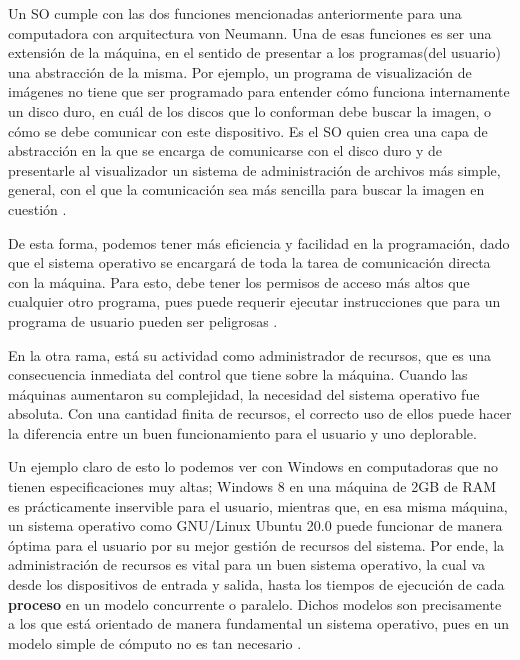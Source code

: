 \documentclass[letterpaper,12pt,oneside]{book}
\begin{document}
		Un SO cumple con las dos funciones mencionadas anteriormente para una computadora con arquitectura von Neumann. Una
		de esas funciones es ser una extensión de la máquina, en el sentido de presentar a los programas(del usuario) una abstracción de la misma.
        Por ejemplo, un programa de visualización de imágenes no tiene que ser programado para entender cómo funciona internamente un disco 
		duro, en cuál de los discos que lo conforman debe buscar la imagen, o cómo se debe comunicar con este dispositivo. Es el SO quien crea
		una capa de abstracción en la que se encarga de comunicarse con el disco duro y de presentarle al visualizador un sistema de administración de
		archivos más simple, general, con el que la comunicación sea más sencilla para buscar la imagen en cuestión \cite{tanenbaum_modern_2002}.
  
        De esta forma, podemos tener más 
		eficiencia y facilidad en la programación, dado que el sistema operativo se encargará de toda la tarea de comunicación directa con la máquina.
		Para esto, debe tener los permisos de acceso más altos que cualquier otro programa, pues puede requerir ejecutar instrucciones
		que para un programa de usuario pueden ser peligrosas \cite{tanenbaum_modern_2002}.

		En la otra rama, está su actividad como administrador de recursos, que es una consecuencia inmediata del control que tiene sobre la máquina.
		Cuando las máquinas aumentaron su complejidad, la necesidad del sistema operativo fue absoluta. Con una cantidad finita de recursos, el correcto
		uso de ellos puede hacer la diferencia entre un buen funcionamiento para el usuario y uno deplorable.
  
        Un ejemplo claro de esto lo podemos ver
		con Windows en computadoras que no tienen especificaciones muy altas; Windows 8 en una máquina de 2GB de RAM es prácticamente inservible para
		el usuario, mientras que, en esa misma máquina, un sistema operativo como GNU/Linux Ubuntu 20.0 puede funcionar de manera óptima para el usuario
		por su mejor gestión de recursos del sistema. Por ende, la administración de recursos es vital para un buen sistema operativo, la cual va
		desde los dispositivos de entrada y salida, hasta los tiempos de ejecución de cada \textbf{proceso} en un modelo concurrente o paralelo.
		Dichos modelos son precisamente a los que está orientado de manera fundamental un sistema operativo, pues en un modelo simple de cómputo no es 
		tan necesario \cite{tanenbaum_modern_2002}.
		
\end{document}
